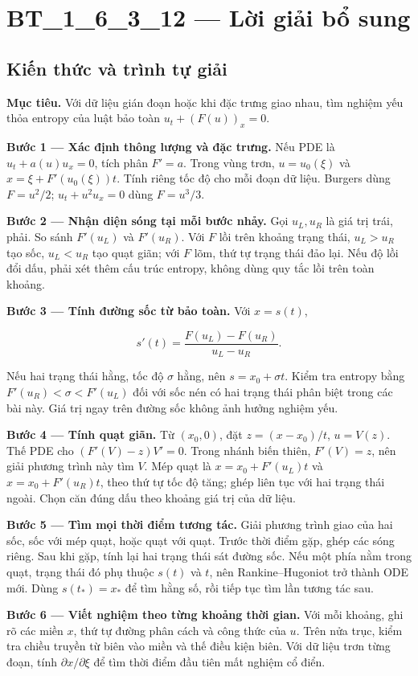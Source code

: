 \documentclass[10pt,a4paper]{article}
\begin{document}
\section*{BT\_1\_6\_3\_12 — Lời giải bổ sung}
\subsection*{Kiến thức và trình tự giải}
\textbf{Mục tiêu.} Với dữ liệu gián đoạn hoặc khi đặc trưng giao nhau, tìm nghiệm yếu thỏa entropy của luật bảo toàn $u_t+(F(u))_x=0$.

\textbf{Bước 1 — Xác định thông lượng và đặc trưng.} Nếu PDE là $u_t+a(u)u_x=0$, tích phân $F'=a$. Trong vùng trơn, $u=u_0(\xi)$ và $x=\xi+F'(u_0(\xi))t$. Tính riêng tốc độ cho mỗi đoạn dữ liệu. Burgers dùng $F=u^2/2$; $u_t+u^2u_x=0$ dùng $F=u^3/3$.

\textbf{Bước 2 — Nhận diện sóng tại mỗi bước nhảy.} Gọi $u_L,u_R$ là giá trị trái, phải. So sánh $F'(u_L)$ và $F'(u_R)$. Với $F$ lồi trên khoảng trạng thái, $u_L>u_R$ tạo sốc, $u_L<u_R$ tạo quạt giãn; với $F$ lõm, thứ tự trạng thái đảo lại. Nếu độ lồi đổi dấu, phải xét thêm cấu trúc entropy, không dùng quy tắc lồi trên toàn khoảng.

\textbf{Bước 3 — Tính đường sốc từ bảo toàn.} Với $x=s(t)$,

\[
s'(t)=\frac{F(u_L)-F(u_R)}{u_L-u_R}.
\]

Nếu hai trạng thái hằng, tốc độ $\sigma$ hằng, nên $s=x_0+\sigma t$. Kiểm tra entropy bằng $F'(u_R)<\sigma<F'(u_L)$ đối với sốc nén có hai trạng thái phân biệt trong các bài này. Giá trị ngay trên đường sốc không ảnh hưởng nghiệm yếu.

\textbf{Bước 4 — Tính quạt giãn.} Từ $(x_0,0)$, đặt $z=(x-x_0)/t$, $u=V(z)$. Thế PDE cho $(F'(V)-z)V'=0$. Trong nhánh biến thiên, $F'(V)=z$, nên giải phương trình này tìm $V$. Mép quạt là $x=x_0+F'(u_L)t$ và $x=x_0+F'(u_R)t$, theo thứ tự tốc độ tăng; ghép liên tục với hai trạng thái ngoài. Chọn căn đúng dấu theo khoảng giá trị của dữ liệu.

\textbf{Bước 5 — Tìm mọi thời điểm tương tác.} Giải phương trình giao của hai sốc, sốc với mép quạt, hoặc quạt với quạt. Trước thời điểm gặp, ghép các sóng riêng. Sau khi gặp, tính lại hai trạng thái sát đường sốc. Nếu một phía nằm trong quạt, trạng thái đó phụ thuộc $s(t)$ và $t$, nên Rankine–Hugoniot trở thành ODE mới. Dùng $s(t_*)=x_*$ để tìm hằng số, rồi tiếp tục tìm lần tương tác sau.

\textbf{Bước 6 — Viết nghiệm theo từng khoảng thời gian.} Với mỗi khoảng, ghi rõ các miền $x$, thứ tự đường phân cách và công thức của $u$. Trên nửa trục, kiểm tra chiều truyền từ biên vào miền và thế điều kiện biên. Với dữ liệu trơn từng đoạn, tính $\partial x/\partial\xi$ để tìm thời điểm đầu tiên mất nghiệm cổ điển.
\end{document}
